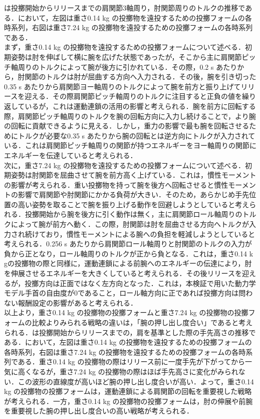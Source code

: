 は投擲開始からリリースまでの肩関節3軸周り，肘関節周りのトルクの推移である．において，左図は重さ0.14 kg の投擲物を遠投するための投擲フォームの各時系列，右図は重さ7.24 kg の投擲物を遠投するための投擲フォームの各時系列である．\\
まず，重さ0.14 kg の投擲物を遠投するための投擲フォームについて述べる．初期姿勢は肘を伸ばして横に腕を広げた状態であったが，そこから主に肩関節ピッチ軸周りのトルクによって腕が後方に引かれている．その際，0.2 s あたりから，肘関節のトルクは肘が屈曲する方向へ入力される．その後，腕を引き切った0.35 s あたりから肩関節ヨー軸周りのトルクによって腕を前方と振り上げてリリースを迎える．その際肩関節ピッチ軸周りのトルクに注目すると正負の値を繰り返しているが，これは運動連鎖の活用の影響と考えられる．腕を前方に回転する際，肩関節ピッチ軸周りのトルクを腕の回転方向に入力し続けることで，より腕の回転に貢献できるように見える．しかし，重力の影響で最も腕を回転させるためにトルクが必要な0.35 s あたりから腕の回転とは逆方向にトルクが入力されている．これは肩関節ピッチ軸周りの関節が持つエネルギーをヨー軸周りの関節にエネルギーを伝達していると考えられる．\\
次に，重さ7.24 kg の投擲物を遠投するための投擲フォームについて述べる．初期姿勢は肘関節を屈曲させて腕を前方高く上げている．これは，慣性モーメントの影響が考えられる．重い投擲物を持って腕を後方へ回転させると慣性モーメントの影響で肩関節や肘関節にかかる負荷が大きい．そのため，あらかじめ手先位置の高い姿勢を取ることで腕を振り上げる動作を回避しようとしていると考えられる．投擲開始から腕を後方に引く動作は無く，主に肩関節ロール軸周りのトルクによって腕が前方へ動く．この際，肘関節は肘を屈曲させる方向へトルクが入力され続けており，慣性モーメントによる腕への負担を軽減しようとしていると考えられる．0.256 s あたりから肩関節ロール軸周りと肘関節のトルクの入力が負から正となり，ロール軸周りのトルクが正から負となる．これは，重さ0.14 k gの投擲物の際と同様に，運動連鎖による前腕へのエネルギーの伝達により，肘を伸展させるエネルギーを大きくしていると考えられる．その後リリースを迎えるが，投擲方向は正面ではなく左方向となった．これは，本検証で用いた動力学モデル手首の自由度が0であること，ロール軸方向に正であれば投擲方向は問わない報酬設定の影響があると考えられる．\\
以上より，重さ0.14 kg の投擲物の投擲フォームと重さ7.24 kg の投擲物の投擲フォームの比較よりみられる戦略の違いは，「腕の押し出し度合い」であると考えられる．は投擲開始からリリースまでの，肩を基準とした際の手先高さの推移である．において，左図は重さ0.14 kg の投擲物を遠投するための投擲フォームの各時系列，右図は重さ7.24 kg の投擲物を遠投するための投擲フォームの各時系列である．重さ0.14 kg の投擲物の際はリリース前に一度手先が下がってから一気に高くなるが，重さ7.24 kg の投擲物の際はほば手先高さに変化がみられない．この波形の直線度が高いほど腕の押し出し度合いが高い．よって，重さ0.14 kg の投擲物の投擲フォームは，運動連鎖による肩関節の回転を重要視した戦略が考えられる．一方，重さ0.14 kg の投擲物の投擲フォームは，肘の伸展や前腕を重要視した腕の押し出し度合いの高い戦略が考えられる．


